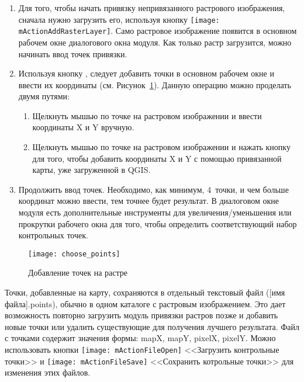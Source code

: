 \begin{enumerate}
\item Для того, чтобы начать привязку непривязанного растрового
изображения, сначала нужно загрузить его, используя кнопку
\texttt{[image: mActionAddRasterLayer]}. Само растровое
изображение появится в основном рабочем окне диалогового окна модуля.
Как только растр загрузится, можно начинать ввод точек привязки.
\item Используя кнопку ,
следует добавить точки в основном рабочем окне и ввести их координаты
(см. Рисунок~\ref{fig:choose_points}). Данную операцию можно проделать
двумя путями:

\begin{enumerate}
\item Щелкнуть мышью по точке на растровом изображении и ввести
координаты X и Y вручную.
\item Щелкнуть мышью по точке на растровом изображении и нажать кнопку
 для того, чтобы добавить координаты X и Y
с помощью привязанной карты, уже загруженной в QGIS.
\end{enumerate}
\item Продолжить ввод точек. Необходимо, как минимум, 4~точки, и чем
больше координат можно ввести, тем точнее будет результат. В диалоговом
окне модуля есть дополнительные инструменты для увеличения/уменьшения
или прокрутки рабочего окна для того, чтобы определить соответствующий
набор контрольных точек.
\end{enumerate}

\begin{figure}[ht]
\centering
  \texttt{[image: choose\_points]}
  \caption{Добавление точек на растре \wincaption}\label{fig:choose_points}
\end{figure}

Точки, добавленные на карту, сохраняются в отдельный текстовый файл
([имя файла].points), обычно в одном каталоге с растровым изображением.
Это дает возможность повторно загрузить модуль привязки растров позже и
добавить новые точки или удалить существующие для получения лучшего
результата. Файл с точками содержит значения формы: mapX, mapY, pixelX,
pixelY. Можно использовать кнопки
\texttt{[image: mActionFileOpen]} <<Загрузить контрольные точки>> и
\texttt{[image: mActionFileSave]} <<Сохранить котрольные точки>>
для изменения этих файлов.

\label{georeferencer_transformation}

